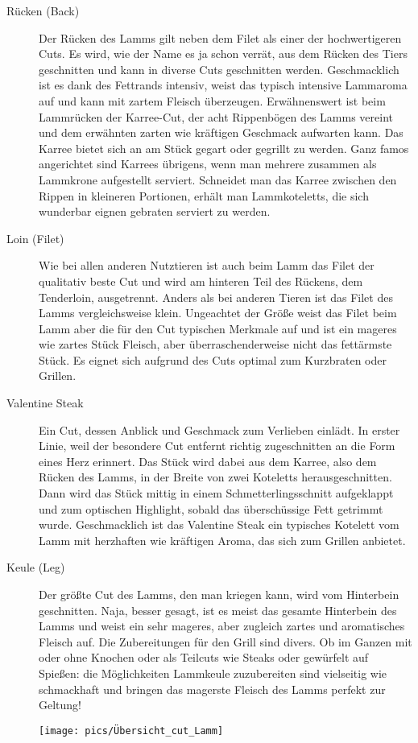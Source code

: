 \begin{description}
	\item [Rücken (Back)]
	Der Rücken des Lamms gilt neben dem Filet als einer der hochwertigeren 
	Cuts. Es wird, wie der Name es ja schon verrät, aus dem Rücken des Tiers 
	geschnitten und kann in diverse Cuts geschnitten werden. Geschmacklich ist 
	es dank des Fettrands intensiv, weist das typisch intensive Lammaroma auf 
	und kann mit zartem Fleisch überzeugen. Erwähnenswert ist beim 
	Lammrücken der Karree-Cut, der acht Rippenbögen des Lamms vereint und 
	dem erwähnten zarten wie kräftigen Geschmack aufwarten kann. Das Karree 
	bietet sich an am Stück gegart oder gegrillt zu werden. Ganz famos 
	angerichtet sind Karrees übrigens, wenn man mehrere zusammen als 
	Lammkrone aufgestellt serviert. Schneidet man das Karree zwischen den 
	Rippen in kleineren Portionen, erhält man Lammkoteletts, die sich wunderbar 
	eignen gebraten serviert zu werden.

	\item [Loin (Filet)]
	Wie bei allen anderen Nutztieren ist auch beim Lamm das Filet der qualitativ 
	beste Cut und wird am hinteren Teil des Rückens, dem Tenderloin, 
	ausgetrennt. Anders als bei anderen Tieren ist das Filet des Lamms 
	vergleichsweise klein. Ungeachtet der Größe weist das Filet beim Lamm aber 
	die für den Cut typischen Merkmale auf und ist ein mageres wie zartes Stück 
	Fleisch, aber überraschenderweise nicht das fettärmste Stück. Es eignet sich 
	aufgrund des Cuts optimal zum Kurzbraten oder Grillen.

	\item [Valentine Steak]
	Ein Cut, dessen Anblick und Geschmack zum Verlieben einlädt. In erster 
	Linie, weil der besondere Cut entfernt richtig zugeschnitten an die Form 
	eines Herz erinnert. Das Stück wird dabei aus dem Karree, also dem Rücken 
	des Lamms, in der Breite von zwei Koteletts herausgeschnitten. Dann wird 
	das Stück mittig in einem Schmetterlingsschnitt aufgeklappt und zum 
	optischen Highlight, sobald das überschüssige Fett getrimmt wurde. 
	Geschmacklich ist das Valentine Steak ein typisches Kotelett vom Lamm mit 
	herzhaften wie kräftigen Aroma, das sich zum Grillen anbietet.

	\item [Keule (Leg)]
	Der größte Cut des Lamms, den man kriegen kann, wird vom Hinterbein 
	geschnitten. Naja, besser gesagt, ist es meist das gesamte Hinterbein des 
	Lamms und weist ein sehr mageres, aber zugleich zartes und aromatisches 
	Fleisch auf. Die Zubereitungen für den Grill sind divers. Ob im Ganzen mit 
	oder ohne Knochen oder als Teilcuts wie Steaks oder gewürfelt auf Spießen: 
	die Möglichkeiten Lammkeule zuzubereiten sind vielseitig wie schmackhaft 
	und bringen das magerste Fleisch des Lamms perfekt zur Geltung!
\end{description}
\newpage
\begin{figure}[htbp]
	\centering
	\begin{minipage}{1\textwidth}
		\centering
		\texttt{[image: pics/Übersicht\_cut\_Lamm]}
		\label{fig:Übersicht2}
	\end{minipage}
\end{figure}
\newpage



